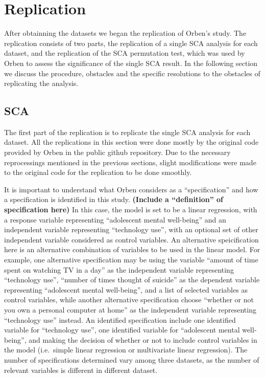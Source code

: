 \documentclass[12pt,twoside]{reedthesis}
\begin{document}
  \section{Replication}\label{replication}
  
  \par 
  
  After obtainning the datasets we began the replication of Orben's study.
  The replication consists of two parts, the replication of a single SCA
  analysis for each dataset, and the replication of the SCA permutation
  test, which was used by Orben to assess the significance of the single
  SCA result. In the following section we discuss the procedure, obstacles
  and the specific resolutions to the obstacles of replicating the
  analysis.
  
  \subsection{SCA}\label{sca}
  
  \par 
  
  The first part of the replication is to replicate the single SCA
  analysis for each dataset. All the replications in this section were
  done mostly by the original code provided by Orben in the public github
  repository. Due to the necessary reprocessings mentioned in the previous
  sections, slight modifications were made to the original code for the
  replication to be done smoothly.
  
  \par 
  
  It is important to understand what Orben considers as a
  ``specification'' and how a specification is identified in this study.
  \textbf{(Include a ``definition'' of specification here)} In this case,
  the model is set to be a linear regression, with a response variable
  representing ``adolescent mental well-being'' and an independent
  variable representing ``technology use'', with an optional set of other
  independent variable considered as control variables. An alternative
  speicification here is an alternative combination of variables to be
  used in the linear model. For example, one alternative specification may
  be using the variable ``amount of time spent on watching TV in a day''
  as the independent variable representing ``technology use'', ``number of
  times thought of suicide'' as the dependent variable representing
  ``adolescent mental well-being'', and a list of selected variables as
  control variables, while another alternative specification choose
  ``whether or not you own a personal computer at home'' as the
  independent variable representing ``technology use'' instead. An
  identified specification include one identified variable for
  ``technology use'', one identified variable for ``adolescent mental
  well-being'', and making the decision of whether or not to include
  control variables in the model (i.e.~simple linear regression or
  multivariate linear regression). The number of specifications determined
  vary among three datasets, as the number of relevant variables is
  different in different dataset.
  
\end{document}
